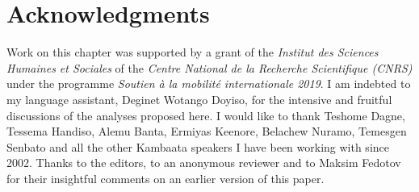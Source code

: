 \documentclass[output=paper,colorlinks,citecolor=brown,
]{langsci/langscibook}
\begin{document}
\section*{Acknowledgments}
Work on this chapter was supported by a grant of the \textit{Institut des Sciences Humaines et Sociales} of the \textit{Centre National de la Recherche Scientifique (CNRS)} under the programme \textit{Soutien à la mobilité internationale 2019}. I am indebted to my language assistant, Deginet Wotango Doyiso, for the intensive and fruitful discussions of the analyses proposed here. I would like to thank Teshome Dagne, Tessema Handiso, Alemu Banta, Ermiyas Keenore, Belachew Nuramo, Temesgen Senbato and all the other Kambaata speakers I have been working with since 2002. Thanks to the editors, to an anonymous reviewer and to Maksim Fedotov for their insightful comments on an earlier version of this paper.



\printbibliography[heading=subbibliography,notkeyword=this]
\end{document}
